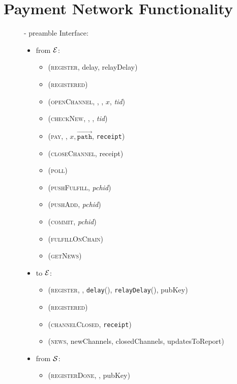 \section{Payment Network Functionality}
  \begin{figure}[H]
    \begin{systembox}{\fpaynet - preamble}
      Interface: 
      \begin{itemize}
        \item from $\mathcal{E}$:
        \begin{itemize}
          \item (\textsc{register}, delay, relayDelay)
          \item (\textsc{registered})
          \item (\textsc{openChannel}, \alice, \bob, $x$, \textit{tid})
          \item (\textsc{checkNew}, \alice, \bob, \textit{tid})
          \item (\textsc{pay}, \bob, $x, \overrightarrow{\mathtt{path}}$,
          \texttt{receipt})
          \item (\textsc{closeChannel}, receipt)
          \item (\textsc{poll})
          \item (\textsc{pushFulfill}, \textit{pchid})
          \item (\textsc{pushAdd}, \textit{pchid})
          \item (\textsc{commit}, \textit{pchid})
          \item (\textsc{fulfillOnChain})
          \item (\textsc{getNews})
        \end{itemize}
        \item to $\mathcal{E}$:
        \begin{itemize}
          \item (\textsc{register}, \alice, \texttt{delay}(\alice),
          \texttt{relayDelay}(\alice), pubKey)
          \item (\textsc{registered})
          \item (\textsc{channelClosed}, \texttt{receipt})
          \item (\textsc{news}, newChannels, closedChannels, updatesToReport)
        \end{itemize}
        \item from $\mathcal{S}$:
        \begin{itemize}
          \item (\textsc{registerDone}, \alice, pubKey)

\end{itemize}
\end{itemize}
\end{systembox}
\end{figure}
